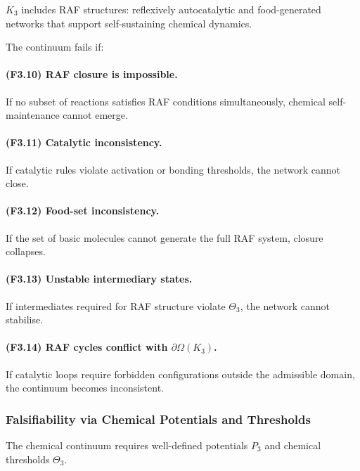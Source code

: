 $K_3$ includes RAF structures: reflexively autocatalytic and
food-generated networks that support self-sustaining chemical dynamics.

The continuum fails if:

\paragraph{(F3.10) RAF closure is impossible.}
If no subset of reactions satisfies RAF conditions simultaneously,
chemical self-maintenance cannot emerge.

\paragraph{(F3.11) Catalytic inconsistency.}
If catalytic rules violate activation or bonding thresholds, the network
cannot close.

\paragraph{(F3.12) Food-set inconsistency.}
If the set of basic molecules cannot generate the full RAF system,
closure collapses.

\paragraph{(F3.13) Unstable intermediary states.}
If intermediates required for RAF structure violate $\Theta_3$, the
network cannot stabilise.

\paragraph{(F3.14) RAF cycles conflict with \texorpdfstring{$\partial\Omega(K_3)$}{\partial\Omega(K_3)}.}
If catalytic loops require forbidden configurations outside the
admissible domain, the continuum becomes inconsistent.



\subsubsection{Falsifiability via Chemical Potentials and Thresholds}

The chemical continuum requires well-defined potentials $P_3$ and
chemical thresholds $\Theta_3$.

